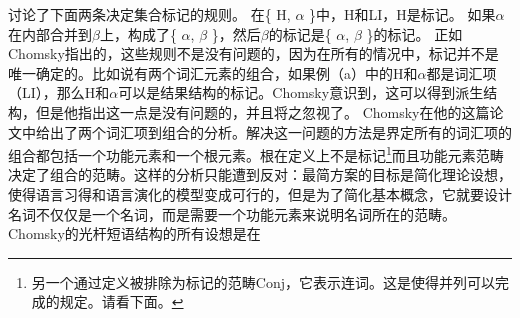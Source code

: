  \citet[]{Chomsky2008a}讨论了下面两条决定集合标记的规则。
\eal
\label{Label-Berechnung}
\ex\label{Label1} 在\{ H, $\alpha$ \}中，H和LI，H是标记。
\ex\label{Label2} 如果$\alpha$在内部合并到$\beta$上，构成了\{ $\alpha$, $\beta$ \}，然后$\beta$的标记是\{ $\alpha$, $\beta$ \}的标记。
\zl
正如Chomsky指出的，这些规则不是没有问题的，因为在所有的情况中，标记并不是唯一确定的。比如说有两个词汇元素的组合，如果例（a）中的H和$\alpha$都是词汇项（LI），那么H和$\alpha$可以是结果结构的标记。Chomsky意识到，这可以得到派生结构，但是他指出这一点是没有问题的，并且将之忽视了。
Chomsky在他的\citeyear{Chomsky2013a}这篇论文中给出了两个词汇项到组合的分析。解决这一问题的方法是界定所有的词汇项的组合都包括一个功能元素和一个根元素\citep{Marantz97a,Borer2005a-u}。根在定义上不是标记\footnote{%
另一个通过定义被排除为标记的范畴Conj，它表示连词\citep[--46]{Chomsky2013a}。这是使得并列可以完成的规定。请看下面。
}而且功能元素范畴决定了组合的范畴\citep[]{Chomsky2013a}。这样的分析只能遭到反对：最简方案的目标是简化理论设想，使得语言习得和语言演化的模型变成可行的，但是为了简化基本概念，它就要设计名词不仅仅是一个名词，而是需要一个功能元素来说明名词所在的范畴。Chomsky的光杆短语结构\citep{Chomsky95b-u}的所有设想是在\xbarc
